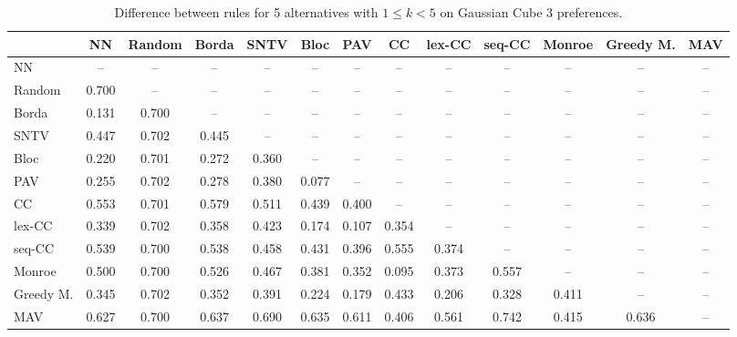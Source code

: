 
\begin{table*}[htbp]
\centering
\begin{tabular}{lcccccccccccc}
\toprule
 & NN & Random & Borda & SNTV & Bloc & PAV & CC & lex-CC & seq-CC & Monroe & Greedy M. & MAV \\
\midrule
NN & -- & -- & -- & -- & -- & -- & -- & -- & -- & -- & -- & -- \\
Random & \cellcolor{blue!70} 0.700 & -- & -- & -- & -- & -- & -- & -- & -- & -- & -- & -- \\
Borda & \cellcolor{blue!13} 0.131 & \cellcolor{blue!70} 0.700 & -- & -- & -- & -- & -- & -- & -- & -- & -- & -- \\
SNTV & \cellcolor{blue!44} 0.447 & \cellcolor{blue!70} 0.702 & \cellcolor{blue!44} 0.445 & -- & -- & -- & -- & -- & -- & -- & -- & -- \\
Bloc & \cellcolor{blue!22} 0.220 & \cellcolor{blue!70} 0.701 & \cellcolor{blue!27} 0.272 & \cellcolor{blue!36} 0.360 & -- & -- & -- & -- & -- & -- & -- & -- \\
PAV & \cellcolor{blue!25} 0.255 & \cellcolor{blue!70} 0.702 & \cellcolor{blue!27} 0.278 & \cellcolor{blue!38} 0.380 & \cellcolor{blue!7} 0.077 & -- & -- & -- & -- & -- & -- & -- \\
CC & \cellcolor{blue!55} 0.553 & \cellcolor{blue!70} 0.701 & \cellcolor{blue!57} 0.579 & \cellcolor{blue!51} 0.511 & \cellcolor{blue!43} 0.439 & \cellcolor{blue!40} 0.400 & -- & -- & -- & -- & -- & -- \\
lex-CC & \cellcolor{blue!33} 0.339 & \cellcolor{blue!70} 0.702 & \cellcolor{blue!35} 0.358 & \cellcolor{blue!42} 0.423 & \cellcolor{blue!17} 0.174 & \cellcolor{blue!10} 0.107 & \cellcolor{blue!35} 0.354 & -- & -- & -- & -- & -- \\
seq-CC & \cellcolor{blue!53} 0.539 & \cellcolor{blue!70} 0.700 & \cellcolor{blue!53} 0.538 & \cellcolor{blue!45} 0.458 & \cellcolor{blue!43} 0.431 & \cellcolor{blue!39} 0.396 & \cellcolor{blue!55} 0.555 & \cellcolor{blue!37} 0.374 & -- & -- & -- & -- \\
Monroe & \cellcolor{blue!50} 0.500 & \cellcolor{blue!70} 0.700 & \cellcolor{blue!52} 0.526 & \cellcolor{blue!46} 0.467 & \cellcolor{blue!38} 0.381 & \cellcolor{blue!35} 0.352 & \cellcolor{blue!9} 0.095 & \cellcolor{blue!37} 0.373 & \cellcolor{blue!55} 0.557 & -- & -- & -- \\
Greedy M. & \cellcolor{blue!34} 0.345 & \cellcolor{blue!70} 0.702 & \cellcolor{blue!35} 0.352 & \cellcolor{blue!39} 0.391 & \cellcolor{blue!22} 0.224 & \cellcolor{blue!17} 0.179 & \cellcolor{blue!43} 0.433 & \cellcolor{blue!20} 0.206 & \cellcolor{blue!32} 0.328 & \cellcolor{blue!41} 0.411 & -- & -- \\
MAV & \cellcolor{blue!62} 0.627 & \cellcolor{blue!70} 0.700 & \cellcolor{blue!63} 0.637 & \cellcolor{blue!69} 0.690 & \cellcolor{blue!63} 0.635 & \cellcolor{blue!61} 0.611 & \cellcolor{blue!40} 0.406 & \cellcolor{blue!56} 0.561 & \cellcolor{blue!74} 0.742 & \cellcolor{blue!41} 0.415 & \cellcolor{blue!63} 0.636 & -- \\
\bottomrule
\end{tabular}

\caption{Difference between rules for 5 alternatives with $1 \leq k < 5$ on Gaussian Cube 3 preferences.}
\label{tab:rule_distance_heatmap-m=[5]-pref_dist=euclidean__args__dimensions=3_-_space=gaussian_cube}
\end{table*}
    
